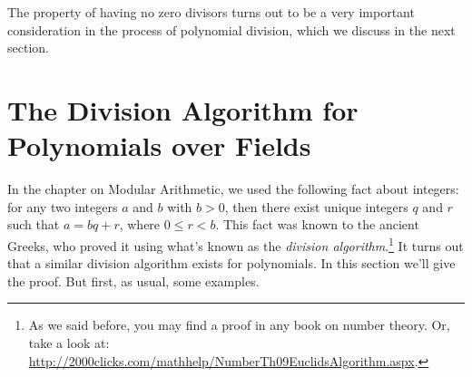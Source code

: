 The property of having no zero divisors turns out to be a very important consideration in the process of polynomial division, which we discuss in the next section.

\section{The Division Algorithm for Polynomials over Fields\quad
{}}\label{divisionalgorithm}
In the chapter on Modular Arithmetic, we used the following fact about integers: for any two integers $a$ and $b$  with $b > 0$, then there exist unique
integers $q$ and $r$ such that $a = bq+r$, where $0 \leq r < b$. This fact was known to the ancient Greeks, who proved it using what's known as the \emph{division algorithm}.\footnote{As we said before, you may find a proof in any book on number theory. Or, take a look at:  \url{http://2000clicks.com/mathhelp/NumberTh09EuclidsAlgorithm.aspx}.} It turns out that a similar
division algorithm exists for
polynomials. In this section we'll  give the proof. But first, as usual, some examples.

